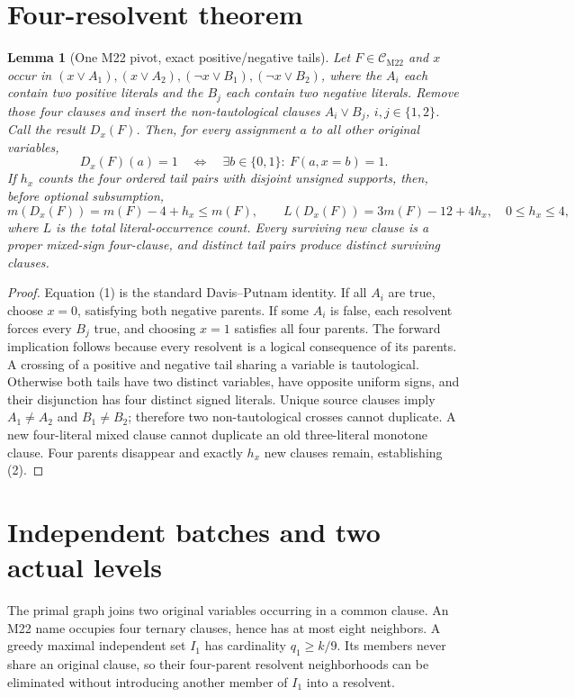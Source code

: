 \documentclass[11pt]{article}
\newtheorem{lemma}[theorem]{Lemma}
\newcommand{\CM}{\mathcal C_{\mathrm{M22}}}
\begin{document}
\section{Four-resolvent theorem}
\begin{lemma}[One M22 pivot, exact positive/negative tails]
Let \(F\in\CM\) and \(x\) occur in
\((x\lor A_1),(x\lor A_2),(\neg x\lor B_1),(\neg x\lor B_2)\),
where the \(A_i\) each contain two positive literals and the \(B_j\)
each contain two negative literals. Remove those four clauses and
insert the non-tautological clauses \(A_i\lor B_j\), \(i,j\in\{1,2\}\).
Call the result \(D_x(F)\). Then, for every assignment \(a\) to
all other original variables,
\[
D_x(F)(a)=1\quad\Longleftrightarrow\quad
\exists b\in\{0,1\}:\ F(a,x=b)=1. \tag{1}
\]
If \(h_x\) counts the four ordered tail pairs with disjoint unsigned
supports, then, before optional subsumption,
\[
m(D_x(F))=m(F)-4+h_x\le m(F),\qquad
L(D_x(F))=3m(F)-12+4h_x, \quad 0\le h_x\le4, \tag{2}
\]
where \(L\) is the total literal-occurrence count.
Every surviving new clause is a proper mixed-sign four-clause,
and distinct tail pairs produce distinct surviving clauses.
\end{lemma}
\begin{proof}
Equation (1) is the standard Davis--Putnam identity.
If all \(A_i\) are true, choose \(x=0\), satisfying both negative
parents. If some \(A_i\) is false, each resolvent forces every
\(B_j\) true, and choosing \(x=1\) satisfies all four parents.
The forward implication follows because every resolvent is
a logical consequence of its parents. A crossing of a positive
and negative tail sharing a variable is tautological.
Otherwise both tails have two distinct variables, have opposite
uniform signs, and their disjunction has four distinct signed
literals. Unique source clauses imply \(A_1\ne A_2\) and \(B_1\ne B_2\);
therefore two non-tautological crosses cannot duplicate.
A new four-literal mixed clause cannot duplicate an old
three-literal monotone clause. Four parents disappear and exactly
\(h_x\) new clauses remain, establishing (2).
\end{proof}

\section{Independent batches and two actual levels}
The primal graph joins two original variables occurring in a
common clause. An M22 name occupies four ternary clauses, hence
has at most eight neighbors. A greedy maximal independent set
\(I_1\) has cardinality \(q_1\ge k/9\). Its members never share an
original clause, so their four-parent resolvent neighborhoods can
be eliminated without introducing another member of \(I_1\)
into a resolvent.
\end{document}
